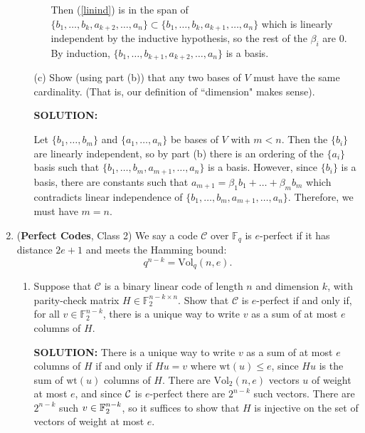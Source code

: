 \documentclass{article}
\newcommand{\cC}{\mathcal{C}}
\newcommand{\F}{\mathbb{F}}
\newcommand{\Vol}{\mathrm{Vol}}
\begin{document}
\begin{enumerate}
\begin{enumerate}
\begin{shaded}
\begin{itemize}
    Then (\ref{linind}) is in the span of $\{b_1,\ldots,b_k, a_{k+2}, \ldots, a_n\} \subset \{b_1, \ldots, b_k, a_{k+1}, \ldots, a_n\}$ which is linearly independent by the inductive hypothesis, so the rest of the $\beta_i$ are $0$. By induction, $\{b_1, \ldots, b_{k+1}, a_{k+2}, \ldots, a_n\}$ is a basis.
\end{itemize}
\end{shaded}


\item[(c)] Show (using part (b)) that any two bases of $V$ must have the same cardinality.  (That is, our definition of ``dimension" makes sense).

\begin{shaded}
\textbf{SOLUTION:}

Let $\{b_1,\ldots, b_m\}$ and $\{a_1,\ldots,a_n\}$ be bases of $V$ with $m < n$. Then the $\{b_i\}$ are linearly independent, so by part (b) there is an ordering of the $\{a_i\}$ basis such that $\{b_1,\ldots,b_m, a_{m+1}, \ldots, a_n\}$ is a basis. However, since $\{b_i\}$ is a basis, there are constants such that $a_{m+1} = \beta_1 b_1 + \ldots + \beta_m b_m$ which contradicts linear independence of $\{b_1,\ldots,b_m, a_{m+1}, \ldots, a_n\}$. Therefore, we must have $m = n$. 

\end{shaded}
\end{enumerate}




\item (\textbf{Perfect Codes}, Class 2) We say a code $\cC$ over $\F_q$ is $e$-perfect if it has distance $2e + 1$ and meets the Hamming bound: 
\[ q^{n-k} = \Vol_q( n, e ). \]

\begin{enumerate}
	\item 
Suppose that $\cC$ is a binary linear code of length $n$ and dimension $k$, with parity-check matrix $H \in \F_2^{n-k\times n}$.
Show that $\cC$ is $e$-perfect if and only if, for all $v \in \F_2^{n-k}$, there is a unique way to write $v$ as a sum of at most $e$ columns of $H$.

\begin{shaded}
\textbf{SOLUTION:}
There is a unique way to write $v$ as a sum of at most $e$ columns of $H$ if and only if $Hu = v$ where $\text{wt}(u) \leq e$, since $Hu$ is the sum of $\text{wt}(u)$ columns of $H$. There are $\Vol_2(n, e)$ vectors $u$ of weight at most $e$, and since $\mathcal{C}$ is $e$-perfect there are $2^{n-k}$ such vectors. There are $2^{n-k}$ such $v \in \mathbb{F}_2^{n-k}$, so it suffices to show that $H$ is injective on the set of vectors of weight at most $e$. 


\end{shaded}
\end{enumerate}
\end{enumerate}
\end{document}
